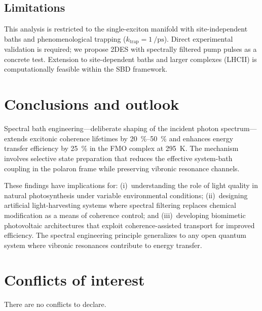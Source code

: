 \documentclass[11pt,a4paper]{article}
\begin{document}
\subsection{Limitations}
This analysis is restricted to the single-exciton manifold with site-independent baths and phenomenological trapping ($k_{\mathrm{trap}} = \SI{1}{\per\pico\second}$). Direct experimental validation is required; we propose 2DES with spectrally filtered pump pulses as a concrete test. Extension to site-dependent baths and larger complexes (LHCII) is computationally feasible within the SBD framework.

\section{Conclusions and outlook}

Spectral bath engineering---deliberate shaping of the incident photon spectrum---extends excitonic coherence lifetimes by \SIrange{20}{50}{\percent} and enhances energy transfer efficiency by \SI{25}{\percent} in the FMO complex at \SI{295}{\kelvin}. The mechanism involves selective state preparation that reduces the effective system-bath coupling in the polaron frame while preserving vibronic resonance channels.

These findings have implications for: (i)~understanding the role of light quality in natural photosynthesis under variable environmental conditions; (ii)~designing artificial light-harvesting systems where spectral filtering replaces chemical modification as a means of coherence control; and (iii)~developing biomimetic photovoltaic architectures that exploit coherence-assisted transport for improved efficiency. The spectral engineering principle generalizes to any open quantum system where vibronic resonances contribute to energy transfer.

\section*{Conflicts of interest}
There are no conflicts to declare.

\end{document}
